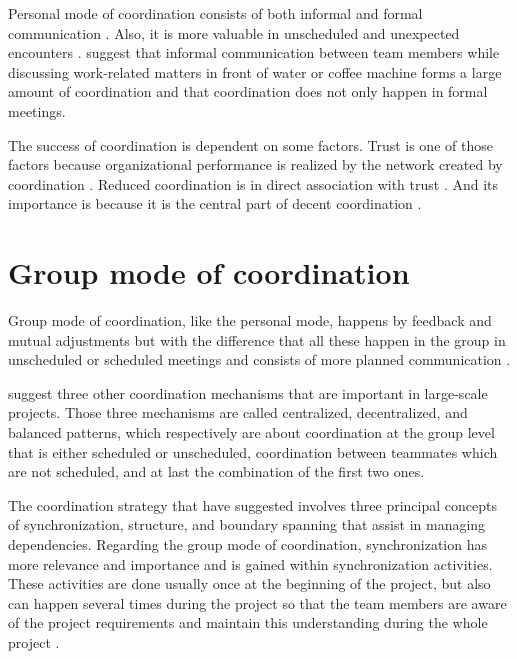 
Personal mode of coordination consists of both informal and formal communication \citep{Kraut1995a}. Also, it is more valuable in unscheduled and unexpected encounters \citep{Boos2011,Dickenson1997}. \citet{Kraut1995a} suggest that informal communication between team members while discussing work-related matters in front of water or coffee machine forms a large amount of coordination and that coordination does not only happen in formal meetings.

The success of coordination is dependent on some factors. Trust is one of those factors because organizational performance is realized by the network created by coordination \citep{DeJong2016}. Reduced coordination is in direct association with trust \citep{RoohullahJan2016}. And its importance is because it is the central part of decent coordination \citep{Osifo2012}. 

\section{Group mode of coordination}

Group mode of coordination, like the personal mode, happens by feedback and mutual adjustments but with the difference that all these happen in the group in unscheduled or scheduled meetings and consists of more planned communication \citep{VanDeVen1976}.

\citet{Dietrich2013} suggest three other coordination mechanisms that are important in large-scale projects. Those three mechanisms are called centralized, decentralized, and balanced patterns, which respectively are about coordination at the group level that is either scheduled or unscheduled, coordination between teammates which are not scheduled, and at last the combination of the first two ones.

The coordination strategy that \citet{Strode2012} have suggested involves three principal concepts of synchronization, structure, and boundary spanning that assist in managing dependencies. Regarding the group mode of coordination, synchronization has more relevance and importance and is gained within synchronization activities. These activities are done usually once at the beginning of the project, but also can happen several times during the project so that the team members are aware of the project requirements and maintain this understanding during the whole project \citep{Strode2012}.


